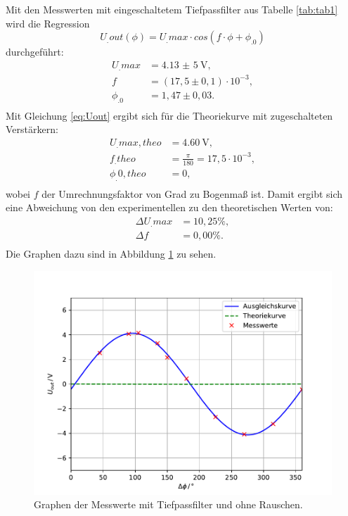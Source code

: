 \noindent Mit den Messwerten mit eingeschaltetem Tiefpassfilter aus Tabelle \ref{tab:tab1} wird die Regression
\begin{equation}
U_.{out}(\phi) = U_.{max}\cdot cos(f\cdot\phi+\phi_.0)\label{eq:Reg}
\end{equation}
durchgeführt:
\begin{align*}
U_.{max} &= \SI{4,13(5)}{\volt}, \\
f 		 &= (17,5\pm0,1)\cdot 10^{-3}, \\
\phi_.0  &= 1,47 \pm0,03 \text{.}\\
\end{align*}
Mit Gleichung \eqref{eq:Uout} ergibt sich für die Theoriekurve mit zugeschalteten Verstärkern:
\begin{align*}
U_.{max,theo} &= \SI{4,60}{\volt}, \\
f_.{theo}	  &= \frac{\pi}{180} = 17,5 \cdot 10^{-3}, \\
\phi_.{0,theo}&= 0, \\
\end{align*}
wobei $f$ der Umrechnungsfaktor von Grad zu Bogenmaß ist.
Damit ergibt sich eine Abweichung von den experimentellen zu den theoretischen Werten von:
\begin{align*}
\Delta U_.{max} &= 10,25\% ,\\
\Delta f		&= 0,00\% \text{.}\\
\end{align*}
Die Graphen dazu sind in Abbildung \ref{fig:U2} zu sehen.

\begin{figure}
\centering
\includegraphics[width=\linewidth-75pt,height=\textheight-75pt,keepaspectratio]{content/images/plot.pdf}
\caption{Graphen der Messwerte mit Tiefpassfilter und ohne Rauschen.}
\label{fig:U2}
\end{figure}


